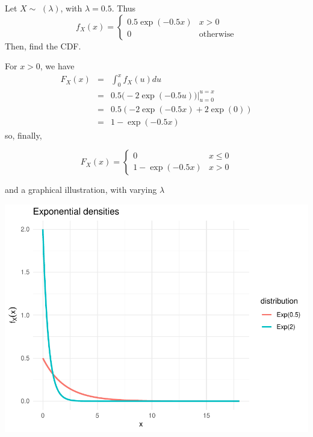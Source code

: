 \documentclass[smaller]{beamer}\usepackage[]{graphicx}\usepackage[]{color}
\newenvironment{knitrout}{}{} %
\begin{document}
\begin{frame}{\secname}
  \begin{small}
  \begin{example}
  Let $X\sim$ $(\lambda)$, with $\lambda =0.5$. Thus
  $$f_X(x) = \left\{ \begin{array}{ll}
  0.5 \exp (-0.5x) & x>0\\
  0 & \text{otherwise}
  \end{array} \right.$$
  Then, find the CDF.
  \pause
  \medskip

  For $x>0$, we have
  \begin{eqnarray*}
  F_{X}(x) & = & \int_{0}^{x}f_{X}(u)du\\
  & = & 0.5\Big( -2\exp (-0.5u)\Big) \bigl|_{u=0}^{u=x}\\
  & = & 0.5(-2\exp (-0.5x)+2\exp (0))\\
  & = & 1-\exp (-0.5x)
  \end{eqnarray*}
\pause
  so, finally,

  $$F_X(x) = \left\{ \begin{array}{ll}
  0 & x \leq 0 \\
  1-\exp (-0.5x)& x>0
  \end{array} \right.$$
  \end{example}
  \end{small}
\end{frame}

\begin{frame}{\secname}
  \begin{example} [continued]

  and a graphical illustration, with varying $\lambda$

\begin{knitrout}
\color{fgcolor}

{\centering \includegraphics[width=0.5\linewidth]{figure/unnamed-chunk-13-1} 

}



\end{knitrout}

  \end{example}
\end{frame}
\end{document}
